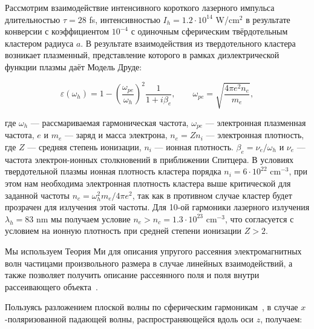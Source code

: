 Рассмотрим взаимодействие интенсивного короткого лазерного импульса длительностью $\tau = 28$ fs, интенсивностью $I_{h} = 1.2 \cdot 10^{14}$ W/cm$^2$ в результате конверсии с коэффициентом $10^{-4}$ с одиночным сферическим твёрдотельным кластером радиуса $a$. В результате взаимодействия из твердотельного кластера возникает плазменный, представление которого в рамках диэлектрической функции плазмы даёт Модель Друде:

    \begin{equation}
		\varepsilon (\omega_{h}) = 1 - {\left( \frac{\omega_{pe}}{\omega_{h}} \right)}^2 \frac{1}{1+i \beta_{e}}, \qquad \omega_{pe} = \sqrt{\frac{4 \pi e^2 n_e}{m_e}},
		\label{eps_plasma}
    \end{equation}

\noindent где $\omega_{h}$ --- рассмариваемая гармоническая частота, $\omega_{pe}$ --- электронная плазменная частота, $e$ и $m_e$ --- заряд и масса электрона, $n_e = Z n_i$ --- электронная плотность, где $Z$ --- средняя степень ионизации, $n_i$ --- ионная плотность. $\beta_{e} = \nu_e / \omega_{h}$ и $\nu_e$ --- частота электрон-ионных столкновений в приближении Спитцера. В условиях твердотельной плазмы ионная плотность кластера порядка $n_i = 6 \cdot 10^{22}$ $\textrm{cm}^{-3}$, при этом нам необходима электронная плотность кластера выше критической для заданной частоты $n_c = \omega_{h}^2 m_e / 4 \pi e^2$, так как в противном случае кластер будет прозрачен для излучения этой частоты. Для 10-ой гармоники лазерного излучения $\lambda_{h} = 83$ nm мы получаем условие $n_e > n_c = 1.3 \cdot 10^{23}$ $\textrm{cm}^{-3}$, что согласуется с условием на ионную плотность при средней степени ионизации $Z > 2$.

Мы используем Теория Ми для описания упругого рассеяния электромагнитных волн частицами произвольного размера в случае линейных взаимодействий, а также позволяет получить описание рассеянного поля и поля внутри рассеивающего объекта~\cite{andreev_lecz, boren_huffman}. 


Пользуясь разложением плоской волны по сферическим гармоникам~\cite{boren_huffman}, в случае $x$-поляризованной падающей волны, распространяющейся вдоль оси $z$, получаем:

